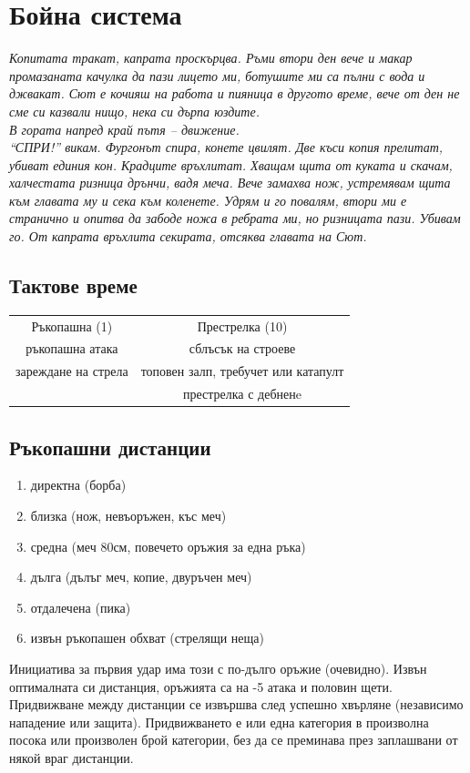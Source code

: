\section{Бойна система}
\emph{Копитата тракат, капрата проскърцва.
Ръми втори ден вече и макар промазаната качулка да пази лицето ми, ботушите ми са пълни с вода и джвакат.
Сют е кочияш на работа и пияница в другото време, вече от ден не сме си казвали нищо, нека си дърпа юздите.
\\
В гората напред край пътя – движение.
\\
“СПРИ!” викам.
Фургонът спира, конете цвилят.
Две къси копия прелитат, убиват единия кон.
Крадците връхлитат.
Хващам щита от куката и скачам, халчестата ризница дрънчи, вадя меча.
Вече замахва нож, устремявам щита към главата му и сека към коленете.
Удрям и го повалям, втори ми е странично и опитва да забоде ножа в ребрата ми, но ризницата пази.
Убивам го. От капрата връхлита секирата, отсяква главата на Сют.}


\subsection{Тактове време}
\begin{tabular}{c | c}
Ръкопашна (1)       & Престрелка (10)                      \\   %
ръкопашна атака     & сблъсък на строеве                   \\
зареждане на стрела & топовен залп, требучет или катапулт  \\
                    & престрелка с дебненe
\end{tabular}

\subsection{Ръкопашни дистанции}
\begin{enumerate}
\item{директна (борба)}
\item{близка (нож, невъоръжен, къс меч)}
\item{средна (меч 80см, повечето оръжия за една ръка)}
\item{дълга (дълъг меч, копие, двуръчен меч)}
\item{отдалечена (пика)}
\item{извън ръкопашен обхват (стрелящи неща)}
\end{enumerate}
Инициатива за първия удар има този с по-дълго оръжие (очевидно).
Извън оптималната си дистанция, оръжията са на -5 атака и половин щети.
Придвижване между дистанции се извършва след успешно хвърляне (независимо нападение или защита).
Придвижването е или една категория в произволна посока или произволен брой категории, без да се преминава през заплашвани от някой враг дистанции. 

